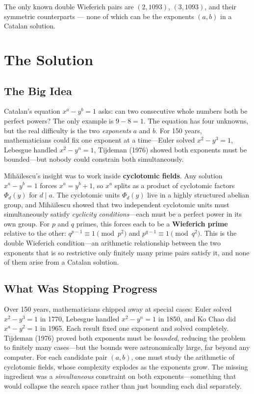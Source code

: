 The only known double Wieferich pairs are $(2, 1093)$, $(3, 1093)$, and their symmetric counterparts — none of which can be the exponents $(a, b)$ in a Catalan solution.

\section{The Solution}

\subsection{The Big Idea}

Catalan's equation $x^a - y^b = 1$ asks: can two consecutive whole numbers both be perfect powers? The only example is $9 - 8 = 1$. The equation has four unknowns, but the real difficulty is the two \emph{exponents} $a$ and $b$. For 150 years, mathematicians could fix one exponent at a time---Euler solved $x^2 - y^3 = 1$, Lebesgue handled $x^2 - y^n = 1$, Tijdeman (1976) showed both exponents must be bounded---but nobody could constrain both simultaneously.

Mihăilescu's insight was to work inside \textbf{cyclotomic fields}. Any solution $x^a - y^b = 1$ forces $x^a = y^b + 1$, so $x^a$ splits as a product of cyclotomic factors $\Phi_d(y)$ for $d \mid a$. The cyclotomic units $\Phi_d(y)$ live in a highly structured abelian group, and Mihăilescu showed that two independent cyclotomic units must simultaneously satisfy \emph{cyclicity conditions}---each must be a perfect power in its own group. For $p$ and $q$ primes, this forces each to be a \textbf{Wieferich prime} relative to the other: $q^{p-1} \equiv 1 \pmod{p^2}$ and $p^{q-1} \equiv 1 \pmod{q^2}$. This is the double Wieferich condition---an arithmetic relationship between the two exponents that is so restrictive only finitely many prime pairs satisfy it, and none of them arise from a Catalan solution.

\subsection{What Was Stopping Progress}

Over 150 years, mathematicians chipped away at special cases: Euler solved $x^2 - y^3 = 1$ in 1770, Lebesgue handled $x^2 - y^n = 1$ in 1850, and Ko Chao did $x^a - y^2 = 1$ in 1965. Each result fixed one exponent and solved completely. Tijdeman (1976) proved both exponents must be \emph{bounded}, reducing the problem to finitely many cases---but the bounds were astronomically large, far beyond any computer. For each candidate pair $(a, b)$, one must study the arithmetic of cyclotomic fields, whose complexity explodes as the exponents grow. The missing ingredient was a \emph{simultaneous} constraint on both exponents---something that would collapse the search space rather than just bounding each dial separately.

